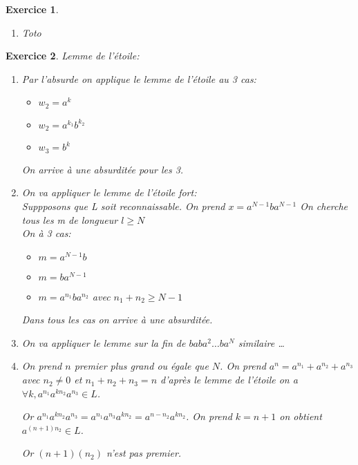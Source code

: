 \documentclass{article}
\theoremstyle{plain}
\newtheorem{exo}{Exercice}%
\begin{document}
\begin{exo}
\begin{enumerate}
    \item Toto
\end{enumerate}    
\end{exo}

\begin{exo}Lemme de l'étoile:
\begin{enumerate}
    \item Par l'absurde on applique le lemme de l'étoile au 3 cas:
        \begin{itemize}
            \item $w_2=a^k$
            \item $w_2=a^{k_1}b^{k_2}$
            \item $w_3=b^k$
        \end{itemize}
        On arrive à une absurditée pour les 3.
    
    \item On va appliquer le lemme de l'étoile fort:\\
        Suppposons que L soit reconnaissable. On prend $x=a^{N-1} b a^{N-1}$
        On cherche tous les m de longueur $l \geq N$\\
        On à 3 cas:
        \begin{itemize}
            \item $m=a^{N-1} b$
            \item $m=ba^{N-1}$
            \item $m=a^{n_1}ba^{n_2}$ avec $n_1 + n_2 \geq N - 1$
        \end{itemize}
        Dans tous les cas on arrive à une absurditée.

    \item On va appliquer le lemme sur la fin de $baba^2\ldots ba^N$ similaire \ldots
    \item On prend $n$ premier plus grand ou égale que $N$. 
    On prend $a^n = a^{n_1} + a^{n_2} + a^{n_3}$ avec $n_2 \neq 0$ et $n_1 + n_2 + n_3 = n$
    d'après le lemme de l'étoile on a $\forall k, a^{n_1}a^{kn_2}a^{n_3} \in L$.

    Or $a^{n_1}a^{kn_2}a^{n_3}=a^{n_1}a^{n_3}a^{kn_2}=a^{n - n_2}a^{kn_2}$.
    On prend $k = n + 1$ on obtient $a^{(n + 1)n_2} \in L$.

    Or $(n + 1)(n_2)$ n'est pas premier.
\end{enumerate}
\end{exo}
\end{document}
